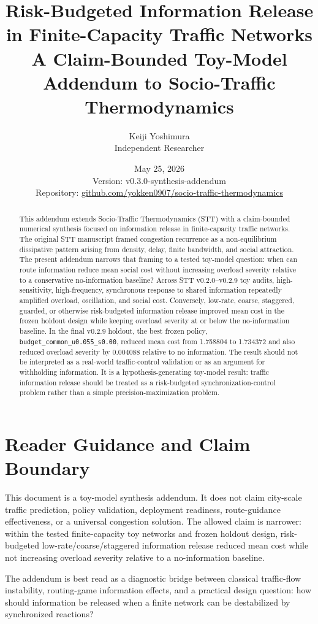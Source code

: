 \documentclass[11pt]{article}
\title{\vspace{-1.5em}\textbf{Risk-Budgeted Information Release in Finite-Capacity Traffic Networks}\\[0.25em]
\large A Claim-Bounded Toy-Model Addendum to Socio-Traffic Thermodynamics}
\author{Keiji Yoshimura\\\small Independent Researcher}
\date{May 25, 2026\\[0.35em]\small Version: v0.3.0-synthesis-addendum\\\small Repository: \href{https://github.com/yokken0907/socio-traffic-thermodynamics}{github.com/yokken0907/socio-traffic-thermodynamics}}
\newcommand{\code}[1]{\texttt{#1}}
\begin{document}
\maketitle

\begin{abstract}
This addendum extends Socio-Traffic Thermodynamics (STT) with a claim-bounded numerical synthesis focused on information release in finite-capacity traffic networks. The original STT manuscript framed congestion recurrence as a non-equilibrium dissipative pattern arising from density, delay, finite bandwidth, and social attraction. The present addendum narrows that framing to a tested toy-model question: when can route information reduce mean social cost without increasing overload severity relative to a conservative no-information baseline? Across STT v0.2.0--v0.2.9 toy audits, high-sensitivity, high-frequency, synchronous response to shared information repeatedly amplified overload, oscillation, and social cost. Conversely, low-rate, coarse, staggered, guarded, or otherwise risk-budgeted information release improved mean cost in the frozen holdout design while keeping overload severity at or below the no-information baseline. In the final v0.2.9 holdout, the best frozen policy, \code{budget\_common\_u0.055\_s0.00}, reduced mean cost from 1.758804 to 1.734372 and also reduced overload severity by 0.004088 relative to no information. The result should not be interpreted as a real-world traffic-control validation or as an argument for withholding information. It is a hypothesis-generating toy-model result: traffic information release should be treated as a risk-budgeted synchronization-control problem rather than a simple precision-maximization problem.
\end{abstract}

\section*{Reader Guidance and Claim Boundary}
This document is a toy-model synthesis addendum. It does not claim city-scale traffic prediction, policy validation, deployment readiness, route-guidance effectiveness, or a universal congestion solution. The allowed claim is narrower: within the tested finite-capacity toy networks and frozen holdout design, risk-budgeted low-rate/coarse/staggered information release reduced mean cost while not increasing overload severity relative to a no-information baseline.

The addendum is best read as a diagnostic bridge between classical traffic-flow instability, routing-game information effects, and a practical design question: how should information be released when a finite network can be destabilized by synchronized reactions?
\end{document}

